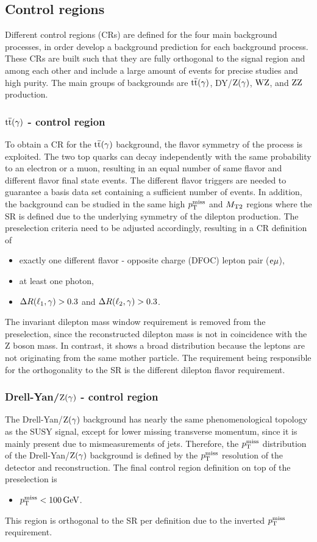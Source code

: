 \subsection{Control regions}\label{sec:CR}
Different control regions (CRs) are defined for the four main background processes, in order develop a background prediction for each background process. These CRs are built such that they are fully orthogonal to the signal region and among each other and include a large amount of events for precise studies and high purity. The main groups of backgrounds are ${\mathrm{t}\overline{\mathrm{t}}}(\gamma)$, DY/$\mathrm{Z}(\gamma)$, $\mathrm{W}\mathrm{Z}$, and $\mathrm{Z}\mathrm{Z}$ production.

\subsubsection*{${\mathrm{t}\overline{\mathrm{t}}}(\gamma)$ - control region}
To obtain a CR for the ${\mathrm{t}\overline{\mathrm{t}}}(\gamma)$ background, the flavor symmetry of the process is exploited. The two top quarks can decay independently with the same probability to an electron or a muon, resulting in an equal number of same flavor and different flavor final state events. The different flavor triggers are needed to guarantee a basis data set containing a sufficient number of events. In addition, the background can be studied in the same high $p_{\mathrm{T}}^\text{miss}$ and $M_{\mathrm{T2}}$ regions where the SR is defined due to the underlying symmetry of the dilepton production. The preselection criteria need to be adjusted accordingly, resulting in a CR definition of
\begin{itemize}
 \item exactly one different flavor - opposite charge (DFOC) lepton pair ($\mathrm{e}{\mu}$),
 \item at least one photon,
 \item $\Delta R(\ell_1,\gamma)>0.3$ and $\Delta R(\ell_2,\gamma)>0.3$.
\end{itemize}
The invariant dilepton mass window requirement is removed from the preselection, since the reconstructed dilepton mass is not in coincidence with the Z boson mass. In contrast, it shows a broad distribution because the leptons are not originating from the same mother particle. The requirement being responsible for the orthogonality to the SR is the different dilepton flavor requirement.
\subsubsection*{Drell-Yan/$\mathrm{Z}(\gamma)$ - control region}
The Drell-Yan/$\mathrm{Z}(\gamma)$ background has nearly the same phenomenological topology as the SUSY signal, except for lower missing transverse momentum, since it is mainly present due to mismeasurements of jets. Therefore, the $p_{\mathrm{T}}^\text{miss}$ distribution of the Drell-Yan/$\mathrm{Z}(\gamma)$ background is defined by the $p_{\mathrm{T}}^\text{miss}$ resolution of the detector and reconstruction. The final control region definition on top of the preselection is
\begin{itemize}
 \item $p_{\mathrm{T}}^\text{miss}<100\,\text{Ge\hspace{-.08em}V}$.
\end{itemize}
This region is orthogonal to the SR per definition due to the inverted $p_{\mathrm{T}}^\text{miss}$ requirement.
